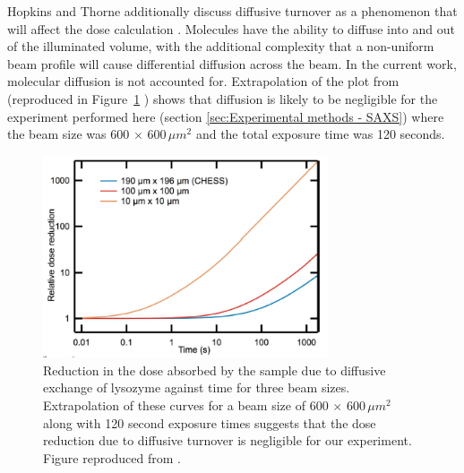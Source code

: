 Hopkins and Thorne additionally discuss diffusive turnover as a phenomenon that will affect the dose calculation \cite{hopkins2016quantifying}.
Molecules have the ability to diffuse into and out of the illuminated volume, with the additional complexity that a non-uniform beam profile will cause differential diffusion across the beam.
In the current work, molecular diffusion is not accounted for.
Extrapolation of the plot from \cite{hopkins2016quantifying} (reproduced in Figure~\ref{fig:Diffusive turnover effect} ) shows that diffusion is likely to be negligible for the experiment performed here (section \ref{sec:Experimental methods - SAXS}) where the beam size was 600 $\times$ 600$\,\mu m^{\text{2}}$ and the total exposure time was 120 seconds.
\begin{figure}
    \centering
    \includegraphics[width=0.75\textwidth]{figures/saxs/diffusive_turnover_effect.png}
    \caption[Effect of diffusive turnover on the dose in SAXS.]{Reduction in the dose absorbed by the sample due to diffusive exchange of lysozyme against time for three beam sizes.
    Extrapolation of these curves for a beam size of 600 $\times$ 600$\,\mu m^{\text{2}}$ along with 120 second exposure times suggests that the dose reduction due to diffusive turnover is negligible for our experiment.
    Figure reproduced from \cite{hopkins2016quantifying}.}
    \label{fig:Diffusive turnover effect}
\end{figure}


